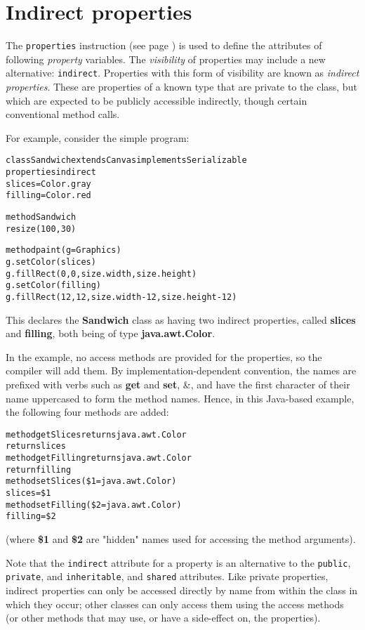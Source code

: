 \chapter{Indirect properties}\label{"id"}
 
The  \texttt{properties} instruction (see page \pageref{refprop})  is used to
define the attributes of following \emph{property} variables.
The \emph{visibility} of properties may include a new alternative:
\texttt{indirect}.
Properties with this form of visibility are known as \emph{indirect
properties}.  These are properties of a known type that are private
to the class, but which are expected to be publicly accessible
indirectly, though certain conventional method calls.
 
For example, consider the simple program:
\begin{alltt}
class Sandwich extends Canvas implements Serializable
  properties indirect
    slices=Color.gray
    filling=Color.red

  method Sandwich
    resize(100,30)

  method paint(g=Graphics)
    g.setColor(slices)
    g.fillRect(0, 0, size.width, size.height)
    g.setColor(filling)
    g.fillRect(12, 12, size.width-12, size.height-12)
\end{alltt}
This declares the \textbf{Sandwich} class as having two indirect
properties, called \textbf{slices} and \textbf{filling}, both being
of type \textbf{java.awt.Color}.
 
In the example, no access methods are provided for the properties, so
the compiler will add them.  By implementation-dependent convention, the
names are prefixed with verbs such as \textbf{get} and \textbf{set},
\&, and have the first character of their name uppercased to form the
method names.
Hence, in this Java-based example, the following four methods are added:
\begin{alltt}
method getSlices  returns java.awt.Color
  return slices
method getFilling returns java.awt.Color
  return filling
method setSlices(\$1=java.awt.Color)
  slices=\$1
method setFilling(\$2=java.awt.Color)
  filling=\$2
\end{alltt}
(where \textbf{\$1} and \textbf{\$2} are "hidden" names used for
accessing the method arguments).
 
Note that the \texttt{indirect} attribute for a property is an
alternative to the \texttt{public}, \texttt{private}, and
\texttt{inheritable}, and \texttt{shared} attributes.
Like private properties, indirect properties can only be accessed
directly by name from within the class in which they occur; other
classes can only access them using the access methods (or other methods
that may use, or have a side-effect on, the properties).
 

